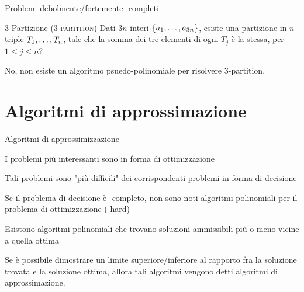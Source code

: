 \begin{frame}{Problemi debolmente/fortemente \NP-completi}

\vspace{-9pt}
\begin{block}{3-Partizione (\textsc{3-partition})}
Dati $3n$ interi $\{a_1, \ldots, a_{3n}\}$, esiste una partizione in $n$
triple $T_1, \ldots, T_n$, tale che la somma dei tre elementi di ogni $T_j$ è
la stessa, per $1 \le j \le n$?
\end{block}

\bigskip
{}

\pause
No, non esiste un algoritmo psuedo-polinomiale per risolvere 3-partition.

\end{frame}

\section{Algoritmi di approssimazione}

\begin{frame}{Algoritmi di approssimizzazione}

\vspace{-3pt}
\BIL
\item I problemi più interessanti sono in forma di ottimizzazione
\item Tali problemi sono "più difficili" dei corrispondenti problemi
in forma di decisione
\item Se il problema di decisione è \NP-completo, non sono noti 
algoritmi polinomiali per il problema di ottimizzazione (\NP-hard)
\item Esistono algoritmi polinomiali che trovano soluzioni ammissibili
più o meno vicine a quella ottima
\EIL

\begin{block}{}
Se è possibile dimostrare un limite superiore/inferiore al rapporto fra la soluzione trovata e la soluzione ottima, allora tali algoritmi
vengono detti \alert{algoritmi di approssimazione}.
\end{block}

\end{frame}

